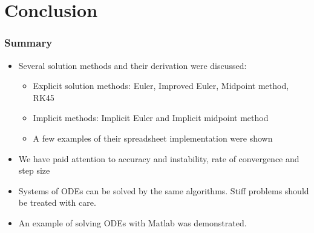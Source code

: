 \documentclass[11pt,table,final,fleqn,xcolor={usenames,dvipsnames,table}]{beamer}
\begin{document}
\section{Conclusion}

\begin{frame}
  \frametitle{Summary}
  \begin{itemize}
    \item Several solution methods and their derivation were discussed:
    \begin{itemize}
      \item Explicit solution methods: Euler, Improved Euler, Midpoint method, RK45
      \item Implicit methods: Implicit Euler and Implicit midpoint method
      \item A few examples of their spreadsheet implementation were shown
    \end{itemize}
    \item We have paid attention to accuracy and instability, rate of convergence and step size
    \item Systems of ODEs can be solved by the same algorithms. Stiff problems should be treated with care.
    \item An example of solving ODEs with Matlab was demonstrated.
  \end{itemize}
\end{frame}
\end{document}
